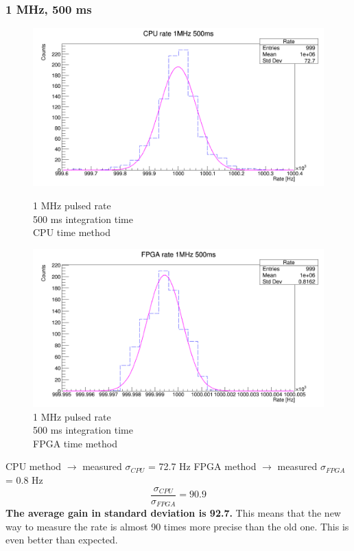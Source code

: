 \subsubsection{1 MHz, 500 ms}
\begin{figure}[H]
	\centering
	\begin{minipage}{0.49\textwidth}
		\centering
		\includegraphics[width=.99\linewidth]{IMG/ch5/RateMeasures/CPU-time-rate-1MHz-500ms}
		\caption{1 MHz pulsed rate\\500 ms integration time\\CPU time method}
		\label{fig:CPU-time-rate-1MHz-500ms}
	\end{minipage}%
	\begin{minipage}{0.49\textwidth}
		\centering
		\includegraphics[width=.99\linewidth]{IMG/ch5/RateMeasures/FPGA-time-rate-1MHz-500ms}
		\caption{1 MHz pulsed rate\\500 ms integration time\\FPGA time method}
		\label{fig:FPGA-time-rate-1MHz-500ms}
	\end{minipage}
\end{figure}
\noindent CPU method $\rightarrow$ measured $\sigma_{CPU}$ = 72.7 Hz
\newline
FPGA method $\rightarrow$ measured $\sigma_{FPGA}$ = 0.8 Hz
\begin{equation}
	\frac{\sigma_{CPU}}{\sigma_{FPGA}} = 90.9
\end{equation}
\newline
\noindent \textbf{The average gain in standard deviation is 92.7.}
\newline
This means that the new way to measure the rate is almost 90 times more precise than the old one. This is even better than expected.

